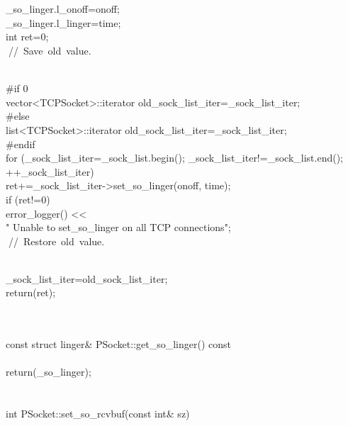 \documentclass{article}
\begin{document}
\\
 {
\\
     _so_linger.l_onoff=onoff;
\\
     _so_linger.l_linger=time;
\\
         int ret=0;
\\
         
\hbox{// Save old value.}\strut\\
 #if 0
\\
         vector<TCPSocket>::iterator old_sock_list_iter=_sock_list_iter;
\\
 #else
\\
         list<TCPSocket>::iterator old_sock_list_iter=_sock_list_iter;
\\
 #endif
\\
     for (_sock_list_iter=_sock_list.begin(); _sock_list_iter!=_sock_list.end();
\\
          ++_sock_list_iter)
\\
         ret+=_sock_list_iter->set_so_linger(onoff, time);
\\
     if (ret!=0)
\\
         error_logger() << 
\\
                                 "    Unable to set_so_linger on all TCP connections\n";
\\
         
\hbox{// Restore old value.}\strut\\
         _sock_list_iter=old_sock_list_iter;
\\
     return(ret);
\\
 }
\\
 
\\
 const struct linger& PSocket::get_so_linger() const
\\
 {
\\
         return(_so_linger);
\\
 }
\\
 
\\
 int PSocket::set_so_rcvbuf(const int& sz)
\\
\end{document}
